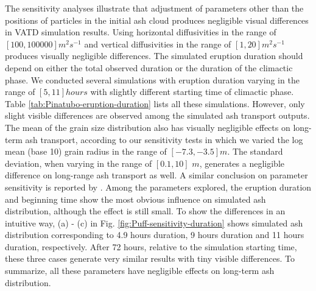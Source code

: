 \documentclass[utf8]{frontiersSCNS} %
\begin{document}
The sensitivity analyses illustrate that adjustment of parameters other than the positions of particles in the initial ash cloud produces negligible visual differences in VATD simulation results. Using horizontal diffusivities in the range of $[100, 100000] m^2s^{-1} $ and vertical diffusivities in the range of $[1, 20] m^2s^{-1}$ produces visually negligible differences. The simulated eruption duration should depend on either the total observed duration or the duration of the climactic phase. We conducted several simulations with eruption duration varying in the range of $[5, 11] hours$ with slightly different starting time of climactic phase. Table \ref{tab:Pinatubo-eruption-duration} lists all these simulations. However, only slight visible differences are observed among the simulated ash transport outputs. The mean of the grain size distribution also has visually negligible effects on long-term ash transport, according to our sensitivity tests in which we varied the log mean (base 10) grain radius in the range of $[-7.3, -3.5] m$. The standard deviation, when varying in the range of $[0.1, 10]$ $m$, generates a negligible difference on long-range ash transport as well. A similar conclusion on parameter sensitivity is reported by \citet[e.g.][]{fero2008simulation, daniele2009applications}. Among the parameters explored, the eruption duration and beginning time show the most obvious influence on simulated ash distribution, although the effect is still small. To show the differences in an intuitive way, 
(a) - (c) in Fig. \ref{fig:Puff-sensitivity-duration} shows simulated ash distribution corresponding to 4.9 hours duration, 9 hours duration and 11 hours duration, respectively. After 72 hours, relative to the simulation starting time, these three cases generate very similar results with tiny visible differences. To summarize, all these parameters have negligible effects on long-term ash distribution.
\end{document}

